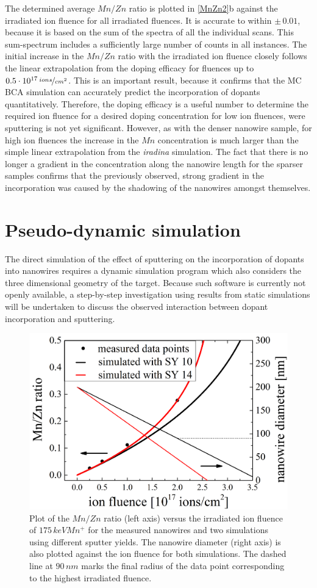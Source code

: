 The determined average $Mn/Zn$ ratio is plotted in \ref{MnZn2}b against the irradiated ion fluence for all irradiated fluences. It is accurate to within $\pm\,0.01$, because it is based on the sum of the spectra of all the individual scans. This sum-spectrum includes a sufficiently large number of counts in all instances. The initial increase in the $Mn/Zn$ ratio with the irradiated ion fluence closely follows the linear extrapolation from the doping efficacy for fluences up to $0.5\cdot 10^{17}\,\nicefrac{ions}{cm^2}$. This is an important result, because it confirms that the MC BCA simulation can accurately predict the incorporation of dopants quantitatively. Therefore, the doping efficacy is a useful number to determine the required ion fluence for a desired doping concentration for low ion fluences, were sputtering is not yet significant. However, as with the denser nanowire sample, for high ion fluences the increase in the $Mn$ concentration is much larger than the simple linear extrapolation from the \emph{iradina} simulation. The fact that there is no longer a gradient in the concentration along the nanowire length for the sparser samples confirms that the previously observed, strong gradient in the incorporation was caused by the shadowing of the nanowires amongst themselves.


\section{Pseudo-dynamic simulation}

The direct simulation of the effect of sputtering on the incorporation of dopants into nanowires requires a dynamic simulation program which also considers the three dimensional geometry of the target. Because such software is currently not openly available, a step-by-step investigation using results from static simulations will be undertaken to discuss the observed interaction between dopant incorporation and sputtering.

\begin{figure}[h]
	\centering
		\includegraphics[width=.7\textwidth]{images/staticsputteryield.png}
	\caption{Plot of the $Mn/Zn$ ratio (left axis) versus the irradiated ion fluence of $175\,keV Mn^+$ for the measured nanowires and two simulations using different sputter yields. The nanowire diameter (right axis) is also plotted against the ion fluence for both simulations. The dashed line at $90\,nm$ marks the final radius of the data point corresponding to the highest irradiated fluence.}
	\label{staticsputter}
\end{figure} 

